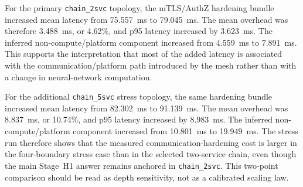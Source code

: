 \begin{table}[ht]
\centering
\caption[Stage~H1 latency: plain vs.\ mTLS AKS chains]{Stage~H1 latency results for plain and mTLS AKS chains. Sources: \texttt{merged/aggregated\_results.md} in \texttt{rq2\_1\_paired\_20260515\_160012} (\texttt{chain\_2svc}) and \texttt{rq2\_1\_paired\_20260517\_114303} (\texttt{chain\_5svc}).}
\label{tab:rq21_latency}
\end{table}

For the primary \texttt{chain\_2svc} topology, the mTLS/AuthZ hardening bundle
increased mean latency from 75.557~ms to 79.045~ms. The mean overhead was
therefore 3.488~ms, or 4.62\%, and p95 latency increased by 3.623~ms. The
inferred non-compute/platform component increased from 4.559~ms to 7.891~ms.
This supports the interpretation that most of the added latency is associated
with the communication/platform path introduced by the mesh rather than with a
change in neural-network computation.

For the additional \texttt{chain\_5svc} stress topology, the same hardening
bundle increased mean latency from 82.302~ms to 91.139~ms. The mean overhead
was 8.837~ms, or 10.74\%, and p95 latency increased by 8.983~ms. The inferred
non-compute/platform component increased from 10.801~ms to 19.949~ms. The
stress run therefore shows that the measured communication-hardening cost is
larger in the four-boundary stress case than in the selected two-service chain,
even though the main Stage~H1 answer remains anchored in \texttt{chain\_2svc}. This
two-point comparison should be read as depth sensitivity, not as a calibrated
scaling law.

